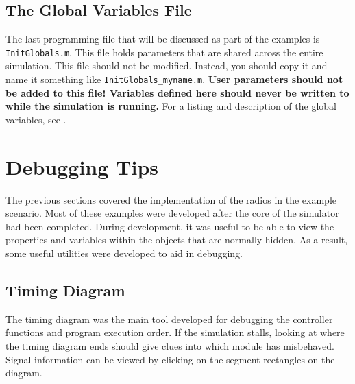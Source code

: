 \subsection{The Global Variables File}\label{sec:initGlobal}

The last programming file that will be discussed as part of the
examples is \verb+InitGlobals.m+.  This file holds parameters that
are shared across the entire simulation.  This file should not be
modified.  Instead, you should copy it and name it something like \verb+InitGlobals_myname.m+.  {\bf User parameters should not be added to this file! Variables defined here should never be written to while the
simulation is running.}  For a listing and description of the global variables, see .

\section{Debugging Tips}
\label{sec:debugging}

The previous sections covered the implementation of the radios in
the example scenario.  Most of these examples were developed after
the core of the simulator had been completed.  During development,
it was useful to be able to view the properties and variables within
the objects that are normally hidden.  As a result, some useful
utilities were developed to aid in debugging.

\subsection{Timing Diagram}
The timing diagram was the main tool developed for debugging the
controller functions and program execution order.  If the simulation
stalls, looking at where the timing diagram ends should give clues
into which module has misbehaved.  Signal information can be viewed
by clicking on the segment rectangles on the diagram.

